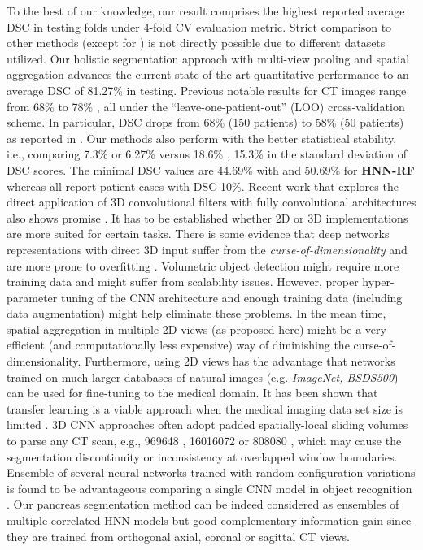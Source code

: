 \documentclass[journal]{IEEEtran}
\begin{document}
\noindent To the best of our knowledge, our result comprises the highest reported average DSC in testing folds under 4-fold CV evaluation metric. Strict comparison to other methods (except for \cite{roth2015deeporgan,roth2016spatial}) is not directly possible due to different datasets utilized. Our holistic segmentation approach with multi-view pooling and spatial aggregation advances the current state-of-the-art quantitative performance to an average DSC of 81.27\% in testing. Previous notable results for CT images range from 68\% to 78\% \cite{wolz2013automated,Chu2013Miccai,tong2015discriminative,okada2015abdominal,oda2016regression}, all under the ``leave-one-patient-out'' (LOO) cross-validation scheme. In particular, DSC drops from 68\% (150 patients) to 58\% (50 patients) as reported in \cite{wolz2013automated}. Our methods also perform with the better statistical stability, i.e., comparing 7.3\%  or 6.27\% versus 18.6\% \cite{Wang2014Miccai}, 15.3\% \cite{Chu2013Miccai} in the standard deviation of DSC scores. The minimal DSC values are 44.69\% with  and 50.69\% for \textbf{HNN-RF} whereas \cite{Wang2014Miccai,Chu2013Miccai,wolz2013automated,roth2015deeporgan} all report patient cases with DSC 10\%. 
Recent work that explores the direct application of 3D convolutional filters with fully convolutional architectures also shows promise \cite{ronneberger2015unet,Merkow2016Dense}. It has to be established whether 2D or 3D implementations are more suited for certain tasks. There is some evidence that deep networks representations with direct 3D input suffer from the \textit{curse-of-dimensionality} and are more prone to overfitting \cite{roth2016improving,Su2015Multi,Su2016Volumetric}. Volumetric object detection might require more training data and might suffer from scalability issues. However, proper hyper-parameter tuning of the CNN architecture and enough training data (including data augmentation) might help eliminate these problems. In the mean time, spatial aggregation in multiple 2D views (as proposed here) might be a very efficient (and computationally less expensive) way of diminishing the curse-of-dimensionality. Furthermore, using 2D views has the advantage that networks trained on much larger databases of natural images (e.g. \textit{ImageNet, BSDS500}) can be used for fine-tuning to the medical domain. It has been shown that transfer learning is a viable approach when the medical imaging data set size is limited \cite{Shin2016Deep,tajbakhsh2016convolutional}. 3D CNN approaches often adopt padded spatially-local sliding volumes to parse any CT scan, e.g., 969648 \cite{Merkow2016Dense}, 16016072 \cite{Dou20163D} or 808080 \cite{Chen2016VoxResNet}, which may cause the segmentation discontinuity or inconsistency at overlapped window boundaries. Ensemble of several neural networks trained with random configuration variations is found to be advantageous comparing a single CNN model in object recognition \cite{simonyan2014very,krizhevsky2012imagenet,Simonyan2014Two}. Our pancreas segmentation method can be indeed considered as ensembles of multiple correlated HNN models but good complementary information gain since they are trained from orthogonal axial, coronal or sagittal CT views.  
\end{document}
